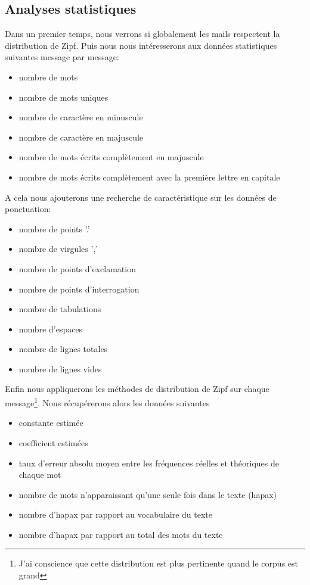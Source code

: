 \documentclass[a4paper,12pt]{article}
\begin{document}
	
	\subsection{Analyses statistiques}
		Dans un premier temps, nous verrons si globalement les mails respectent la distribution de Zipf. Puis nous nous intéresserons aux données statistiques suivantes message par message:
		\begin{itemize}
			\item nombre de mots
			\item nombre de mots uniques
			\item nombre de caractère en minuscule
			\item nombre de caractère en majuscule
			\item nombre de mots écrits complètement en majuscule
			\item nombre de mots écrits complètement avec la première lettre en capitale
		\end{itemize}
		A cela nous ajouterons une recherche de caractéristique sur les données de ponctuation:
		\begin{itemize}
			\item nombre de points '.'
			\item nombre de virgules ','
			\item nombre de points d'exclamation
			\item nombre de points d'interrogation
			\item nombre de tabulations
			\item nombre d'espaces
			\item nombre de lignes totales
			\item nombre de lignes vides
		\end{itemize}
		Enfin nous appliquerons les méthodes de distribution de Zipf sur chaque message\footnote{J'ai conscience que cette distribution est plus pertinente quand le corpus est grand}. Nous récupérerons alors les données suivantes
		\begin{itemize}
			\item constante estimée
			\item coefficient estimées
			\item taux d'erreur absolu moyen entre les fréquences réelles et théoriques de chaque mot
			\item nombre de mots n'apparaissant qu'une seule fois dans le texte (hapax)
			\item nombre d'hapax par rapport au vocabulaire du texte
			\item nombre d'hapax par rapport au total des mots du texte
		\end{itemize}
		
\end{document}
